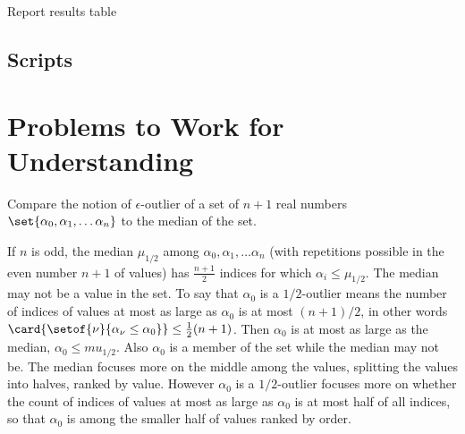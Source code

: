 \documentclass[12pt]{article}
\begin{document}
\begin{example}
\begin{algorithm}[H]
     Report results table\;
\end{algorithm}
\subsection*{Scripts}



\hr

\section*{Problems to Work for Understanding}
\renewcommand{\theexerciseseries}{}
\renewcommand{\theexercise}{\arabic{exercise}}

\begin{exercise}
    Compare the notion of \( \epsilon \)-outlier of a set of \( n+1 \)
    real numbers \( \set{\alpha_0, \alpha_1, \dots \alpha_n} \) to the
    median of the set.
\end{exercise}
\begin{solution}
    If \( n \) is odd, the median \( \mu_{1/2} \) among \( \alpha_0,
    \alpha_1, \dots \alpha_n \) (with repetitions possible in the even
    number \( n+1 \) of values) has \( \frac
    {n+1}{2} \) indices for which \( \alpha_i \le \mu_{1/2} \).  The
    median may not be a value in the set.  To
    say that \( \alpha_0 \) is a \(1/2\)-outlier means the number of
    indices of values at most as large as \( \alpha_0 \) is  at most
    \( (n+1)/2 \), in other words \( \card{%
      \setof{\nu}{\alpha_{\nu} \le \alpha_0}} \le \frac{1}{2}(n+1) \).
    Then \( \alpha_0 \) is at most as large as the median, \( \alpha_0
    \le mu_{1/2} \). Also \( \alpha_0 \) is a member of the set while
    the median may not be.  The median focuses more on the middle
    among the values, splitting the values into halves, ranked by
    value.
    However \( \alpha_0 \) is a \( 1/2 \)-outlier focuses more on
    whether the count of
    indices of values at most as large as \( \alpha_0 \) is  at most
    half of all indices, so that \( \alpha_0 \) is among the smaller
    half of values ranked by order.


\end{solution}
\end{example}
\end{document}

